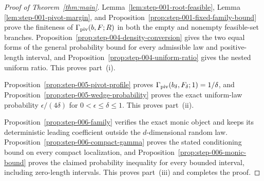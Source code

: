 \begin{proof}[Proof of Theorem~\ref{thm:main}]
Lemma~\ref{lem:step-001-root-feasible}, Lemma
\ref{lem:step-001-pivot-margin}, and
Proposition~\ref{prop:step-001-fixed-family-bound} prove the finiteness of
$\Gamma_{\rm piv}(b,F;R)$ in both the empty and nonempty feasible-set
branches.  Proposition~\ref{prop:step-004-density-conversion} gives the two
equal forms of the general probability bound for every admissible law and
positive-length interval, and
Proposition~\ref{prop:step-004-uniform-ratio} gives the nested uniform ratio.
This proves part~\textnormal{(i)}.

Proposition~\ref{prop:step-005-pivot-profile} proves
$\Gamma_{\rm piv}(b_\delta,F_\delta;1)=1/\delta$, and
Proposition~\ref{prop:step-005-wedge-probability} proves the exact uniform-law
probability $\epsilon/(4\delta)$ for
$0<\epsilon\leq\delta\leq1$.  This proves part~\textnormal{(ii)}.

Proposition~\ref{prop:step-006-family} verifies the exact monic object and
keeps its deterministic leading coefficient outside the $d$-dimensional
random law.  Proposition~\ref{prop:step-006-compact-gamma} proves the stated
conditioning bound on every compact localization, and
Proposition~\ref{prop:step-006-monic-bound} proves the claimed probability
inequality for every bounded interval, including zero-length intervals.
This proves part~\textnormal{(iii)} and completes the proof.
\end{proof}
